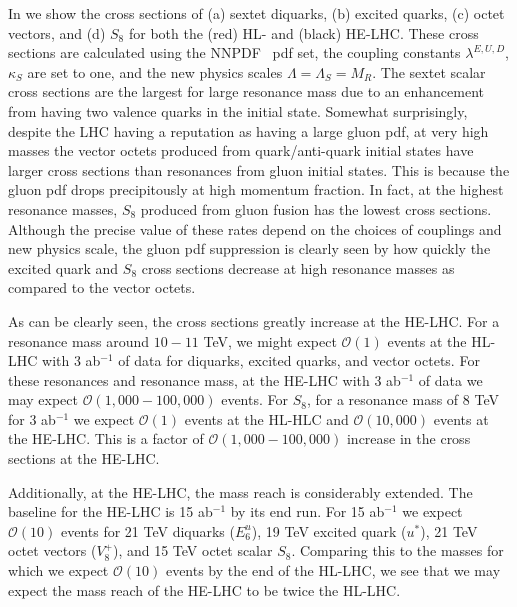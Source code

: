 In  we show the cross sections of (a) sextet diquarks, (b) excited quarks, (c) octet vectors, and (d) $S_8$ for both the (red) HL- and (black) HE-LHC.  These cross sections are calculated using the NNPDF~\cite{Ball:2014uwa} pdf set, the coupling constants $\lambda^{E,U,D}$,$\kappa_S$ are set to one, and the new physics scales $\Lambda=\Lambda_S=M_R$.    The sextet scalar cross sections are the largest for large resonance mass due to an enhancement from having two valence quarks in the initial state.  Somewhat surprisingly, despite the LHC having a reputation as having a large gluon pdf, at very high masses the vector octets produced from quark/anti-quark initial states have larger cross sections than resonances from gluon initial states.  This is because the gluon pdf drops precipitously at high momentum fraction.  In fact, at the highest resonance masses, $S_8$ produced from gluon fusion has the lowest cross sections.  Although the precise value of these rates depend on the choices of couplings and new physics scale, the gluon pdf suppression is clearly seen by how quickly the excited quark and $S_8$ cross sections decrease at high resonance masses as compared to the vector octets.

As can be clearly seen, the cross sections greatly increase at the HE-LHC.  For a resonance mass around $10-11$ TeV, we might expect $\mathcal{O}(1)$ events at the HL-LHC with 3 ab$^{-1}$ of data for diquarks, excited quarks, and vector octets. For these resonances and resonance mass, at the HE-LHC with 3 ab$^{-1}$ of data we may expect $\mathcal{O}(1,000-100,000)$ events.  For $S_8$, for a resonance mass of 8 TeV for 3 ab$^{-1}$ we expect $\mathcal{O}(1)$ events at the HL-HLC and $\mathcal{O}(10,000)$ events at the HE-LHC.   This is a factor of $\mathcal{O}(1,000-100,000)$ increase in the cross sections at the HE-LHC.

Additionally, at the HE-LHC, the mass reach is considerably extended.  The baseline for the HE-LHC is 15 ab$^{-1}$ by its end run.  For 15 ab$^{-1}$ we expect $\mathcal{O}(10)$ events for 21 TeV diquarks ($E_6^u$), 19 TeV excited quark ($u^*$), 21 TeV octet vectors ($V_8^+$), and 15 TeV octet scalar $S_8$.  Comparing this to the masses for which we expect $\mathcal{O}(10)$ events by the end of the HL-LHC, we see that we may expect the mass reach of the HE-LHC to be twice the HL-LHC.

